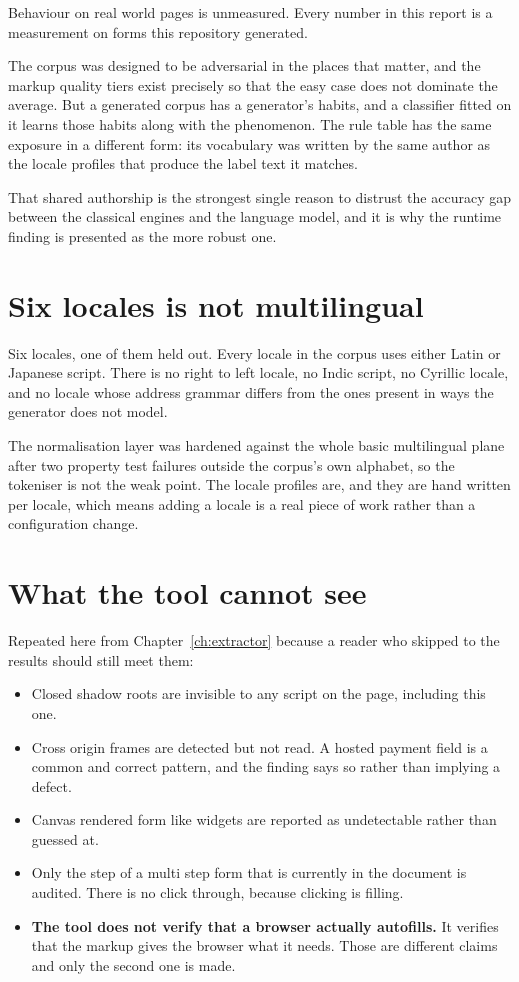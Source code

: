 Behaviour on real world pages is unmeasured. Every number in this report is a
measurement on forms this repository generated.

The corpus was designed to be adversarial in the places that matter, and the
markup quality tiers exist precisely so that the easy case does not dominate the
average. But a generated corpus has a generator's habits, and a classifier fitted
on it learns those habits along with the phenomenon. The rule table has the same
exposure in a different form: its vocabulary was written by the same author as
the locale profiles that produce the label text it matches.

That shared authorship is the strongest single reason to distrust the accuracy
gap between the classical engines and the language model, and it is why the
runtime finding is presented as the more robust one.

\section{Six locales is not multilingual}

Six locales, one of them held out. Every locale in the corpus uses either Latin
or Japanese script. There is no right to left locale, no Indic script, no Cyrillic
locale, and no locale whose address grammar differs from the ones present in ways
the generator does not model.

The normalisation layer was hardened against the whole basic multilingual plane
after two property test failures outside the corpus's own alphabet, so the
tokeniser is not the weak point. The locale profiles are, and they are hand
written per locale, which means adding a locale is a real piece of work rather
than a configuration change.

\section{What the tool cannot see}

Repeated here from Chapter~\ref{ch:extractor} because a reader who skipped to the
results should still meet them:

\begin{itemize}
  \item Closed shadow roots are invisible to any script on the page, including
    this one.
  \item Cross origin frames are detected but not read. A hosted payment field is
    a common and correct pattern, and the finding says so rather than implying a
    defect.
  \item Canvas rendered form like widgets are reported as undetectable rather
    than guessed at.
  \item Only the step of a multi step form that is currently in the document is
    audited. There is no click through, because clicking is filling.
  \item \textbf{The tool does not verify that a browser actually autofills.} It
    verifies that the markup gives the browser what it needs. Those are different
    claims and only the second one is made.
\end{itemize}

